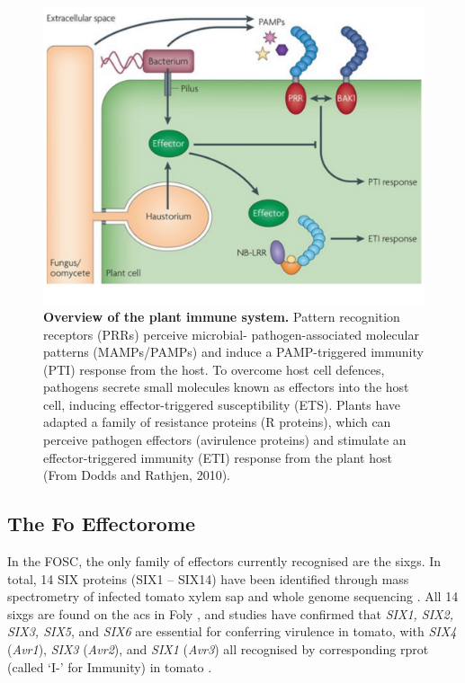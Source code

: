 \begin{figure}[h!]
    \centering
    \includegraphics[width=\textwidth]{Figures/DoddsArticleModel.pdf}
    \caption[Overview of the plant immune system.]{\textbf{Overview of the plant immune system.} Pattern recognition receptors (PRRs) perceive microbial- pathogen-associated molecular patterns (MAMPs/PAMPs) and induce a PAMP-triggered immunity (PTI) response from the host. To overcome host cell defences, pathogens secrete small molecules known as effectors into the host cell, inducing effector-triggered susceptibility (ETS). Plants have adapted a family of resistance proteins (R proteins), which can perceive pathogen effectors (avirulence proteins) and stimulate an effector-triggered immunity (ETI) response from the plant host (From Dodds and Rathjen, 2010).}
    \label{fig:PlantImmuneSystem}
\end{figure}


\subsection{The \acl{Fo} Effectorome}
\label{Chap1:fusariumEffectorome}

In the \ac{FOSC}, the only family of effectors currently recognised are the \acfp{sixg}. In total, 14 SIX proteins (SIX1 – SIX14) have been identified through mass spectrometry of infected tomato xylem sap and whole genome sequencing \parencite{Houterman2007}.  All 14 \acp{sixg} are found on the \acp{ac} in \ac{Foly} \parencite{Schmidt2013}, and studies have confirmed that \textit{SIX1, SIX2, SIX3, SIX5}, and \textit{SIX6} are essential for conferring virulence in tomato, with  \textit{SIX4} (\textit{Avr1}), \textit{SIX3} (\textit{Avr2}), and \textit{SIX1} (\textit{Avr3}) all recognised by corresponding \ac{rprot} (called ‘I-’ for Immunity) in tomato \parencite{Rep2004, Lievens2009, Takken2010, Gawehns2014, Ma2015}. 

